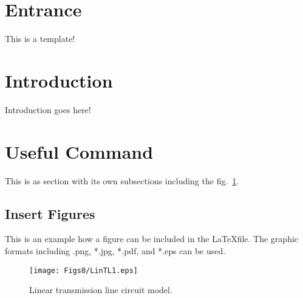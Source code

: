 \documentclass[12pt,oneside]{article}
\begin{document}
\isCUtitlefalse
\htitle{}{}
%
\toc

\section*{Entrance} \label{sec:entree}
This is a template!

\section{Introduction} \label{sec:intro}
Introduction goes here!
%
\section{Useful Command} \label{sec:useful}
This is as section with its own subsections including the fig.~\ref{fig:1}.
\subsection{Insert Figures} \label{sec:fig}
This is an example how a figure can be included in the \LaTeX file. The graphic formats including .png, *.jpg, *.pdf, and *.eps can be used.
\begin{figure}[!ht] 
\centering
\texttt{[image: Figs0/LinTL1.eps]}
\caption{Linear transmission line circuit model.} 
\label{fig:1}
\end{figure} 
%
%
%
\newpage

\end{document}
